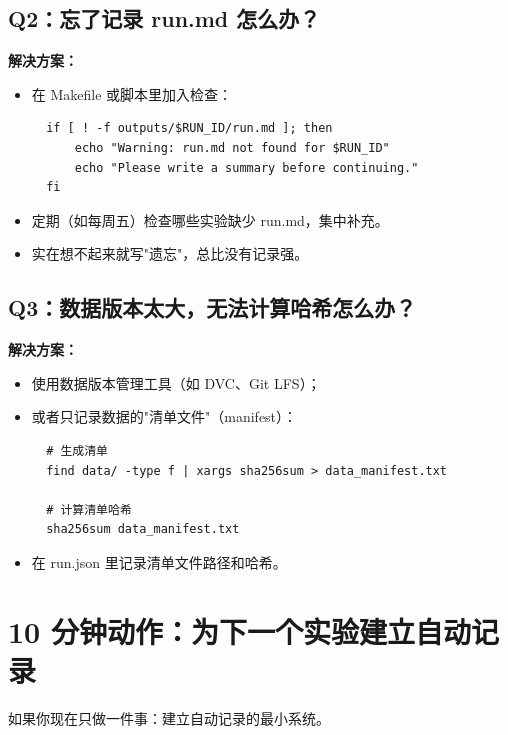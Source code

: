 \subsection{Q2：忘了记录 run.md 怎么办？}

\textbf{解决方案：}
\begin{itemize}
  \item 在 Makefile 或脚本里加入检查：
  \begin{verbatim}
  if [ ! -f outputs/$RUN_ID/run.md ]; then
      echo "Warning: run.md not found for $RUN_ID"
      echo "Please write a summary before continuing."
  fi
  \end{verbatim}

  \item 定期（如每周五）检查哪些实验缺少 run.md，集中补充。

  \item 实在想不起来就写"遗忘"，总比没有记录强。
\end{itemize}

\subsection{Q3：数据版本太大，无法计算哈希怎么办？}

\textbf{解决方案：}
\begin{itemize}
  \item 使用数据版本管理工具（如 DVC、Git LFS）；
  \item 或者只记录数据的"清单文件"（manifest）：
  \begin{verbatim}
  # 生成清单
  find data/ -type f | xargs sha256sum > data_manifest.txt

  # 计算清单哈希
  sha256sum data_manifest.txt
  \end{verbatim}

  \item 在 run.json 里记录清单文件路径和哈希。
\end{itemize}

\section{10 分钟动作：为下一个实验建立自动记录}

如果你现在只做一件事：建立自动记录的最小系统。

